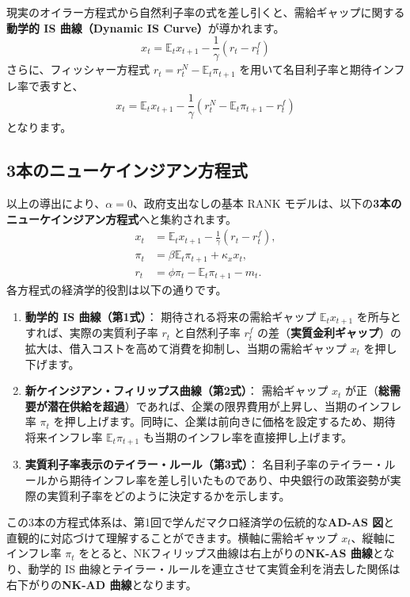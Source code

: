 \documentclass[
  japanese,
  lualatex,
  ja=standard,
  12pt,
  a4paper]{ltjsarticle}
\providecommand{\tightlist}{%
  \setlength{\itemsep}{0pt}\setlength{\parskip}{0pt}}
\begin{document}
現実のオイラー方程式から自然利子率の式を差し引くと、需給ギャップに関する\textbf{動学的
IS 曲線（Dynamic IS Curve）}が導かれます。 \[
x_t=\mathbb{E}_t x_{t+1}
-\frac{1}{\gamma}\left(r_t-r_t^f\right)
\] さらに、フィッシャー方程式 \(r_t=r_t^N-\mathbb{E}_t\pi_{t+1}\)
を用いて名目利子率と期待インフレ率で表すと、 \[
x_t=\mathbb{E}_t x_{t+1}
-\frac{1}{\gamma}
\left(r_t^N-\mathbb{E}_t\pi_{t+1}-r_t^f\right)
\] となります。

\Needspace{0.50\textheight}

\subsection{3本のニューケインジアン方程式}\label{ux672cux306eux30cbux30e5ux30fcux30b1ux30a4ux30f3ux30b8ux30a2ux30f3ux65b9ux7a0bux5f0f}

以上の導出により、\(\alpha=0\)、政府支出なしの基本 RANK
モデルは、以下の\textbf{3本のニューケインジアン方程式}へと集約されます。
\[
\begin{aligned}
x_t
&=
\mathbb{E}_t x_{t+1}
-\frac{1}{\gamma}(r_t-r_t^f),\\
\pi_t
&=
\beta\mathbb{E}_t\pi_{t+1}
+\kappa_x x_t,\\
r_t
&=
\phi\pi_t-\mathbb{E}_t\pi_{t+1}-m_t.
\end{aligned}
\] 各方程式の経済学的役割は以下の通りです。

\begin{enumerate}
\def\labelenumi{\arabic{enumi}.}
\tightlist
\item
  \textbf{動学的 IS 曲線（第1式）}： 期待される将来の需給ギャップ
  \(\mathbb{E}_t x_{t+1}\) を所与とすれば、実際の実質利子率 \(r_t\)
  と自然利子率 \(r_t^f\)
  の差（\textbf{実質金利ギャップ}）の拡大は、借入コストを高めて消費を抑制し、当期の需給ギャップ
  \(x_t\) を押し下げます。
\item
  \textbf{新ケインジアン・フィリップス曲線（第2式）}： 需給ギャップ
  \(x_t\)
  が正（\textbf{総需要が潜在供給を超過}）であれば、企業の限界費用が上昇し、当期のインフレ率
  \(\pi_t\)
  を押し上げます。同時に、企業は前向きに価格を設定するため、期待将来インフレ率
  \(\mathbb{E}_t \pi_{t+1}\) も当期のインフレ率を直接押し上げます。
\item
  \textbf{実質利子率表示のテイラー・ルール（第3式）}：
  名目利子率のテイラー・ルールから期待インフレ率を差し引いたものであり、中央銀行の政策姿勢が実際の実質利子率をどのように決定するかを示します。
\end{enumerate}

この3本の方程式体系は、第1回で学んだマクロ経済学の伝統的な\textbf{AD-AS
図}と直観的に対応づけて理解することができます。横軸に需給ギャップ
\(x_t\)、縦軸にインフレ率 \(\pi_t\)
をとると、NKフィリップス曲線は右上がりの\textbf{NK-AS
曲線}となり、動学的 IS
曲線とテイラー・ルールを連立させて実質金利を消去した関係は右下がりの\textbf{NK-AD
曲線}となります。
\end{document}
